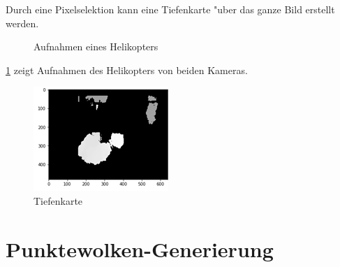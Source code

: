 \noindent Durch eine Pixelselektion kann eine Tiefenkarte "uber das ganze Bild erstellt werden.

\begin{figure}%
	\centering
	\qquad
	\caption{Aufnahmen eines Helikopters}%
	\label{fig:stereoheli}%
\end{figure}

\noindent \ref{fig:stereoheli} zeigt Aufnahmen des Helikopters von beiden Kameras.

\begin{figure}[H]
	\includegraphics[scale=2.0]{bilder/Tiefenkarte}
	\caption[Tiefenkarte]{Tiefenkarte}
	\label{fig:tiefenkarte}%
\end{figure}

\section{Punktewolken-Generierung} 
\label{sec:pointgen}

